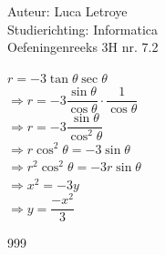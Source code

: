 \documentclass[a4paper]{article}
\begin{document}
  
\noindent \large Auteur: Luca Letroye        \\
\noindent \large Studierichting: Informatica \\
\noindent \large Oefeningenreeks 3H nr. 7.2 \\

\medskip

\normalsize

$r = -3\tan \theta \sec \theta$\\

$\Rightarrow r = -3\dfrac{\sin \theta}{\cos \theta} \cdot \dfrac{1}{\cos\theta}$\\

$\Rightarrow r = -3\dfrac{\sin\theta}{\cos^2 \theta}$\\

$\Rightarrow r\cos^2\theta = -3\sin\theta$\\

$\Rightarrow r^2\cos^2\theta = -3r\sin\theta$\\

$\Rightarrow x^2 = -3y$\\

$\Rightarrow y = \dfrac{-x^2}{3}$\\


\begin{thebibliography}{999}
\end{thebibliography}
\end{document}
